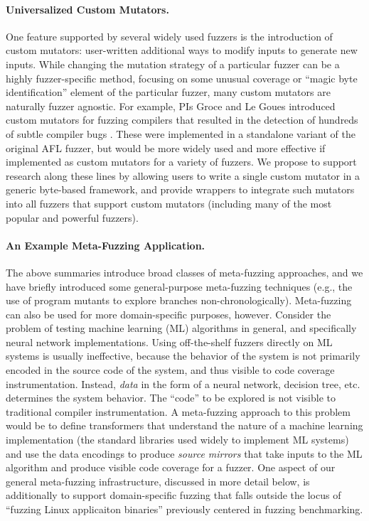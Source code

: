 \documentclass[numbers]{proposalnsf}
\begin{document}
\paragraph{Universalized Custom Mutators.}  One feature supported by several widely used fuzzers is the introduction of custom mutators:  user-written additional ways to modify inputs to generate new inputs.  While changing the mutation strategy of a particular fuzzer can be a highly fuzzer-specific method, focusing on some unusual coverage or ``magic byte identification'' element of the particular fuzzer, many custom mutators are naturally fuzzer agnostic.  For example, PIs Groce and Le Goues introduced custom mutators for fuzzing compilers that resulted in the detection of hundreds of subtle compiler bugs \cite{CC22}.  These were implemented in a standalone variant of the original AFL fuzzer, but would be more widely used and more effective if implemented as custom mutators for a variety of fuzzers.  We propose to support research along these lines by allowing users to write a single custom mutator in a generic byte-based framework, and provide wrappers to integrate such mutators into all fuzzers that support custom mutators (including many of the most popular and powerful fuzzers).
   
\paragraph{An Example Meta-Fuzzing Application.} The above summaries introduce broad classes of meta-fuzzing approaches, and we have briefly introduced some general-purpose meta-fuzzing techniques (e.g., the use of program mutants to explore branches non-chronologically).  Meta-fuzzing can also be used for more domain-specific purposes, however.  Consider the problem of testing machine learning (ML) algorithms in general, and specifically neural network implementations.  Using off-the-shelf fuzzers directly on ML systems is usually ineffective, because the behavior of the system is not primarily encoded in the source code of the system, and thus visible to code coverage instrumentation.  Instead, \emph{data} in the form of a neural network, decision tree, etc. determines the system behavior.  The ``code'' to be explored is not visible to traditional compiler instrumentation.  A meta-fuzzing approach to this problem would be to define transformers that understand the nature of a machine learning implementation (the standard libraries used widely to implement ML systems) and use the data encodings to produce \emph{source mirrors} that take inputs to the ML algorithm and produce visible code coverage for a fuzzer.  One aspect of our general meta-fuzzing infrastructure, discussed in more detail below, is additionally to support domain-specific fuzzing that falls outside the locus of ``fuzzing Linux applicaiton binaries'' previously centered in fuzzing benchmarking.
\end{document}
